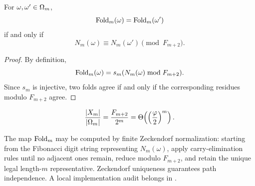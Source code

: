\begin{proposition}
\label{prop:fold-residue-equivalence}
For \(\omega,\omega'\in\Omega_m\),
\[
\operatorname{Fold}_m(\omega)=\operatorname{Fold}_m(\omega')
\]
if and only if
\[
N_m(\omega)\equiv N_m(\omega')\pmod{F_{m+2}}.
\]
\end{proposition}

\begin{proof}
By definition,
\[
\operatorname{Fold}_m(\omega)=s_m(N_m(\omega)\bmod F_{m+2}).
\]
Since \(s_m\) is injective, two folds agree if and only if the corresponding residues modulo \(F_{m+2}\) agree.
\end{proof}

\begin{corollary}
\label{cor:state-count-reduction}
\[
\frac{|X_m|}{|\Omega_m|}
=\frac{F_{m+2}}{2^m}
=\Theta\!\left(\left(\frac{\varphi}{2}\right)^m\right).
\]
\end{corollary}

\begin{remark}
The map \(\operatorname{Fold}_m\) may be computed by finite Zeckendorf normalization: starting from the Fibonacci digit string representing \(N_m(\omega)\), apply carry-elimination rules until no adjacent ones remain, reduce modulo \(F_{m+2}\), and retain the unique legal length-\(m\) representative.  Zeckendorf uniqueness guarantees path independence.  A local implementation audit belongs in .
\end{remark}
